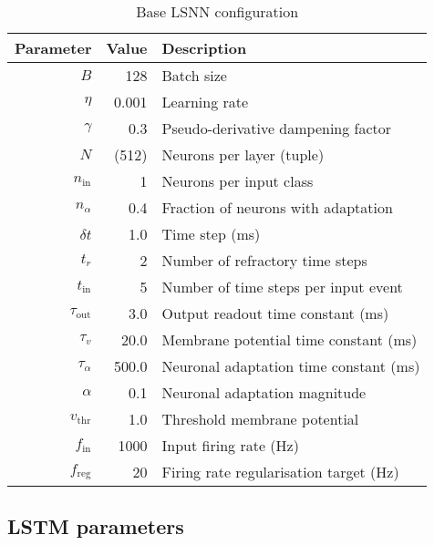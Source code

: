 \documentclass[../../report.tex]{subfiles}
\begin{document}
\begin{table}
  \begin{center}
    \renewcommand{\arraystretch}{1.25}
    \begin{tabular}{ r | r | l  }
      Parameter & Value & Description
      \\ \hline
      \(B\) & 128 & Batch size
      \\
      \(\eta\) & 0.001 & Learning rate
      \\
      \(\gamma\) & 0.3 & Pseudo-derivative dampening factor
      \\
      \(N\) & (512) & Neurons per layer (tuple)
      \\
      \(n_\mathrm{in}\) & 1 & Neurons per input class
      \\
      \(n_\alpha\) & 0.4 & Fraction of neurons with adaptation
      \\
      \(\delta t\) & 1.0 & Time step (ms)
      \\
      \(t_r\) & 2 & Number of refractory time steps
      \\
      \(t_\mathrm{in}\) & 5 & Number of time steps per input event
      \\
      \(\tau_\mathrm{out}\) & 3.0 & Output readout time constant (ms)
      \\
      \(\tau_v\) & 20.0 & Membrane potential time constant (ms)
      \\
      \(\tau_\alpha\) & 500.0 & Neuronal adaptation time constant (ms)
      \\
      \(\alpha\) & 0.1 & Neuronal adaptation magnitude
      \\
      \(v_\mathrm{thr}\) & 1.0 & Threshold membrane potential
      \\
      \(f_\mathrm{in}\) & 1000 & Input firing rate (Hz)
      \\
      \(f_\mathrm{reg}\) & 20 & Firing rate regularisation target (Hz)
      \\
    \end{tabular}
  \end{center}
  \caption{Base LSNN configuration}
  \label{tab:lsnn-base}
\end{table}

\subsection{LSTM parameters}
\end{document}
